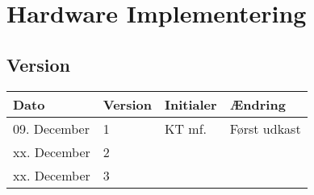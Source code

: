 \chapter{Hardware Implementering}\label{ch:hwimpl}
\section*{Version}
\begin{table}[h]
	\centering
	\begin{tabularx}{\textwidth - 2cm}{|l|l|l|X|}
	\hline
	Dato			& Version			& Initialer 		& Ændring										\\ \hline
	09. December	& 1 				& KT mf.	 		& Først udkast			\\ \hline
	xx. December	& 2 				& 			 		& 						\\ \hline
	xx. December	& 3 				& 			 		& 						\\ \hline
	\end{tabularx}
\end{table}
\clearpage

\clearpage

